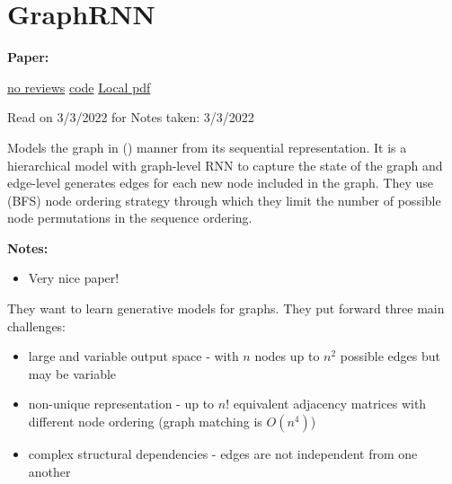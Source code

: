 \clearpage

\section{GraphRNN}\label{sec:graphrnn}

\begin{notebox}
\textbf{Paper: } 
\vspace{5pt}

\href{}{no reviews}
\hspace{1cm}
\href{https://github.com/snap-stanford/GraphRNN}{code}
\hspace{1cm}
\href{run:/home/magda/Dropbox/Zot/You et al_2018_GraphRNN.pdf}{Local pdf}
\vspace{3pt}

Read on 3/3/2022 for 
\hfill Notes taken: 3/3/2022 
\end{notebox}

\begin{notebox}[colback=red!5]
\tldr Models the graph in  () manner from its sequential representation. 
It is a hierarchical model with graph-level RNN to capture the state of the graph and edge-level generates edges for each new node included in the graph.
They use  (BFS) node ordering strategy through which they limit the number of possible node permutations in the sequence ordering.
\end{notebox}

\begin{notebox}[colback=yellow!5]
\textbf{Notes:} 
\begin{itemize}[nosep]
\item Very nice paper! 
\end{itemize}
\end{notebox}

They want to learn generative models for graphs. They put forward three main challenges:
\begin{itemize}[nosep]
\item large and variable output space - with $n$ nodes up to $n^2$ possible edges but may be variable
\item non-unique representation - up to $n!$ equivalent adjacency matrices with different node ordering (graph matching is $O(n^4)$)
\item complex structural dependencies - edges are not independent from one another
\end{itemize}

